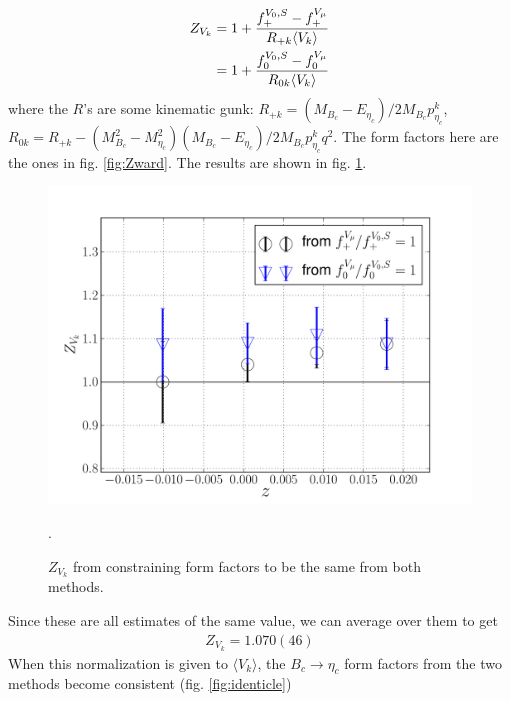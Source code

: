 \begin{align}
	Z_{V_k} &= 1 + {f_+^{V_0,S} - f_+^{V_{\mu}} \over R_{+k} \langle V_k \rangle }  \\
	&= 1 + {f_0^{V_0,S} - f_0^{V_{\mu}} \over R_{0k} \langle V_k \rangle }
\end{align}
where the $R$'s are some kinematic gunk: $R_{+k} = ( M_{B_c} - E_{\eta_c} )/2M_{B_c}p_{\eta_c}^k$,\\ $R_{0k} = R_{+k} - {( M_{B_c}^2-M_{\eta_c}^2 )(M_{B_c}-E_{\eta_c})/2M_{B_c} p_{\eta_c}^k q^2}$. The form factors here are the ones in fig. \ref{fig:Zward}. The results are shown in fig. \ref{fig:ZVk}.
\begin{figure}[htb!]
\centering
\includegraphics[scale=0.5]{images/NRQCD/ZVk_fromBcetac.pdf}
\caption{$Z_{V_k}$ from constraining form factors to be the same from both methods.}.
\label{fig:ZVk}
\end{figure}
Since these are all estimates of the same value, we can average over them to get
\begin{align}
	Z_{V_k} = 1.070(46)
\end{align}
When this normalization is given to $\langle V_k \rangle$, the $B_c\to\eta_c$ form factors from the two methods become consistent (fig. \ref{fig:identicle})
